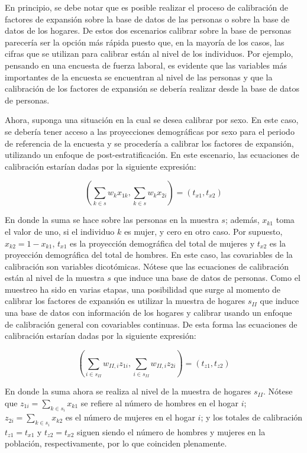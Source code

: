 \documentclass[
  12pt,
  spanish,
]{book}
\begin{document}
En principio, se debe notar que es posible realizar el proceso de calibración de factores de expansión sobre la base de datos de las personas o sobre la base de datos de los hogares. De estos dos escenarios calibrar sobre la base de personas parecería ser la opción más rápida puesto que, en la mayoría de los casos, las cifras que se utilizan para calibrar están al nivel de los individuos. Por ejemplo, pensando en una encuesta de fuerza laboral, es evidente que las variables más importantes de la encuesta se encuentran al nivel de las personas y que la calibración de los factores de expansión se debería realizar desde la base de datos de personas.

Ahora, suponga una situación en la cual se desea calibrar por sexo. En este caso, se debería tener acceso a las proyecciones demográficas por sexo para el periodo de referencia de la encuesta y se procedería a calibrar los factores de expansión, utilizando un enfoque de post-estratificación. En este escenario, las ecuaciones de calibración estarían dadas por la siguiente expresión:

\[
\left ( \sum_{k \in s} w_k x_{1k}, \sum_{k \in s} w_k x_{2i} \right )=(t_{x1}, t_{x2})
\]

En donde la suma se hace sobre las personas en la muestra \(s\); además, \(x_{k1}\) toma el valor de uno, si el individuo \(k\) es mujer, y cero en otro caso. Por supuesto, \(x_{k2} = 1 - x_{k1}\), \(t_{x1}\) es la proyección demográfica del total de mujeres y \(t_{x2}\) es la proyección demográfica del total de hombres. En este caso, las covariables de la calibración son variables dicotómicas. Nótese que las ecuaciones de calibración están al nivel de la muestra \(s\) que induce una base de datos de personas. Como el muestreo ha sido en varias etapas, una posibilidad que surge al momento de calibrar los factores de expansión es utilizar la muestra de hogares \(s_{II}\) que induce una base de datos con información de los hogares y calibrar usando un enfoque de calibración general con covariables continuas. De esta forma las ecuaciones de calibración estarían dadas por la siguiente expresión:

\[
\left ( \sum_{i \in s_{II}} w_{II,i} z_{1i}, \sum_{i \in s_{II}} w_{II,i} z_{2i}\right )=(t_{z1}, t_{z2})
\]

En donde la suma ahora se realiza al nivel de la muestra de hogares \(s_{II}\). Nótese que \(z_{1i}=\sum_{k \in s_i} x_{k1}\) se refiere al número de hombres en el hogar \(i\); \(z_{2i}=\sum_{k \in s_i} x_{k2}\) es el número de mujeres en el hogar \(i\); y los totales de calibración \(t_{z1} = t_{x1}\) y \(t_{z2} = t_{x2}\) siguen siendo el número de hombres y mujeres en la población, respectivamente, por lo que coinciden plenamente.
\end{document}
